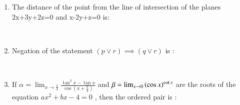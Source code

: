 \documentclass[journal,12pt,twocolumn]{IEEEtran}
\theoremstyle{remark}
\begin{document}
\begin{enumerate}[start=1]
\item 
The distance of the point  from the line of intersection of the planes 2x+3y+2z=0 and x-2y+z=0 is:
\begin{enumerate}
\end{enumerate}
\begin{enumerate}
\end{enumerate}
\\

\item 
Negation of the statement $\left(p \vee r \right) \implies \left(q \vee r \right)$ is :
\begin{enumerate}
\end{enumerate}
\begin{enumerate}
\end{enumerate}
\\

\item 
If $\alpha= \lim_{x \to \frac{\pi}{4}} \frac{\tan^3{x}-\tan{x}}{\cos{\left(x+\frac{\pi}{4}\right)} }$ and $\beta = \lim_{x \to 0} \left(\cos{x}\right)^{\cot{x}}$ are the roots of the equation $ax^2+bx-4=0$ , then the ordered pair  is :
\begin{enumerate}
\end{enumerate}
\begin{enumerate}
\end{enumerate}
\\


\end{enumerate}
\end{document}
